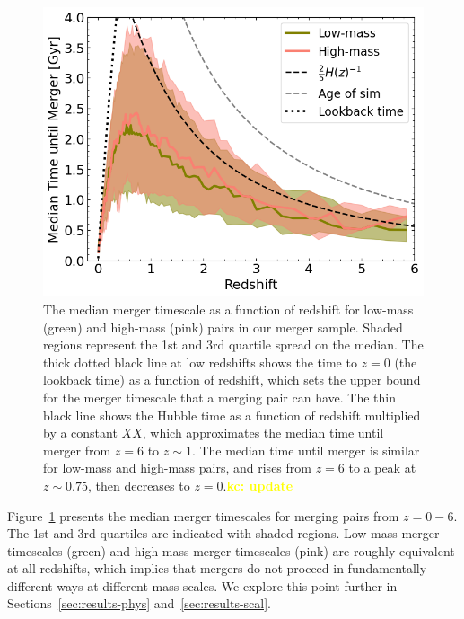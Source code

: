 \documentclass[twocolumn,linenumbers]{aastex631}
\newcommand{\kc}[1]{\textcolor{yellow}{\textbf{kc: #1}} }
\begin{document}
        
        \begin{figure}[tb]
            \centering
            \includegraphics[width=\columnwidth]{plots/bet-on-it/8_timescale_mod.png}
            \caption{The median merger timescale as a function of redshift for low-mass (green) and high-mass (pink) pairs in our merger sample. 
            Shaded regions represent the 1st and 3rd quartile spread on the median. 
            The thick dotted black line at low redshifts shows the time to $z=0$ (the lookback time) as a function of redshift, which sets the upper bound for the merger timescale that a merging pair can have. 
            The thin black line shows the Hubble time as a function of redshift multiplied by a constant $XX$, which approximates the median time until merger from $z=6$ to $z\sim1$.
            The median time until merger is similar for low-mass and high-mass pairs, and rises from $z=6$ to a peak at $z\sim0.75$, then decreases to $z=0$.\kc{update}}
            \label{fig:timescales}
        \end{figure}
    

        Figure~\ref{fig:timescales} presents the median merger timescales for merging pairs from $z=0-6$. 
        The 1st and 3rd quartiles are indicated with shaded regions. 
        Low-mass merger timescales (green) and high-mass merger timescales (pink) are roughly equivalent at all redshifts, which implies that mergers do not proceed in fundamentally different ways at different mass scales. 
        We explore this point further in Sections~\ref{sec:results-phys} and~\ref{sec:results-scal}.
        
\end{document}

